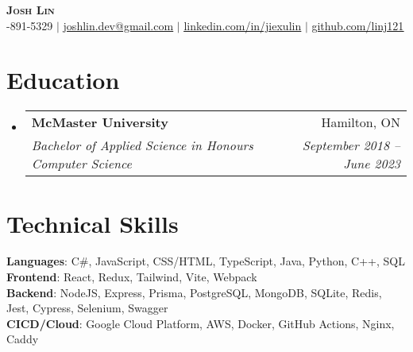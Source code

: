 \documentclass[letterpaper,11pt]{article}
\makeatletter
\newcommand{\resumeSubheading}[4]{
  \vspace{-2pt}\item
    \begin{tabular*}{0.97\textwidth}[t]{l@{\extracolsep{\fill}}r}
      \textbf{#1} & #2 \\
      \textit{\small#3} & \textit{\small #4} \\
    \end{tabular*}\vspace{-7pt}
}
\newcommand{\resumeSubHeadingListStart}{\begin{itemize}[leftmargin=0.15in, label={}]}
\newcommand{\resumeSubHeadingListEnd}{\end{itemize}}
\makeatother
\begin{document}

\begin{center}
    \textbf{\Huge \scshape Josh Lin} \\ \vspace{7pt}
    \small \faPhone \thinspace {}-891-5329
    $|$ \faEnvelope \thinspace \thinspace \href{mailto:joshlin.dev@gmail.com}{\underline{joshlin.dev@gmail.com}}
    $|$ \faLinkedin \thinspace \thinspace \href{https://linkedin.com/in/jiexulin}{\underline{linkedin.com/in/jiexulin}}
    $|$ \faGithub \thinspace \thinspace \href{https://github.com/linj121}{\underline{github.com/linj121}}
\end{center}


\section{Education}
  \resumeSubHeadingListStart
    \resumeSubheading
      {McMaster University}{Hamilton, ON}
      {Bachelor of Applied Science in Honours Computer Science}{September 2018 -- June 2023}
  \resumeSubHeadingListEnd

%

\section{Technical Skills}
 \begin{itemize}[leftmargin=0.15in, label={}]
    \small{\item{
      \textbf{Languages}{: C\#, JavaScript, CSS/HTML, TypeScript, Java, Python, C++, SQL} \\
      \textbf{Frontend}{: React, Redux, Tailwind, Vite, Webpack } \\
      \textbf{Backend}{: NodeJS, Express, Prisma, PostgreSQL, MongoDB, SQLite, Redis, Jest, Cypress, Selenium, Swagger } \\
      \textbf{CICD/Cloud}{: Google Cloud Platform, AWS, Docker, GitHub Actions, Nginx, Caddy } \\
     }}
 \end{itemize}
\end{document}
